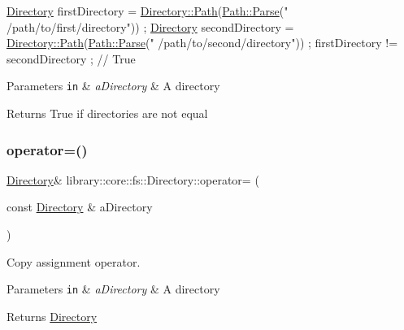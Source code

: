 \begin{DoxyCode}
\hyperlink{classlibrary_1_1core_1_1fs_1_1_directory_a3ec39f6cad19a81d520e9a1f2d8bb1f7}{Directory} firstDirectory = \hyperlink{classlibrary_1_1core_1_1fs_1_1_directory_a6d3ea04654841e62a4dbd99feb563caf}{Directory::Path}(\hyperlink{classlibrary_1_1core_1_1fs_1_1_path_a6ba644b6609507e724c217bf2020f5ae}{Path::Parse}(\textcolor{stringliteral}{"
      /path/to/first/directory"})) ;
\hyperlink{classlibrary_1_1core_1_1fs_1_1_directory_a3ec39f6cad19a81d520e9a1f2d8bb1f7}{Directory} secondDirectory = \hyperlink{classlibrary_1_1core_1_1fs_1_1_directory_a6d3ea04654841e62a4dbd99feb563caf}{Directory::Path}(\hyperlink{classlibrary_1_1core_1_1fs_1_1_path_a6ba644b6609507e724c217bf2020f5ae}{Path::Parse}(\textcolor{stringliteral}{"
      /path/to/second/directory"})) ;
firstDirectory != secondDirectory ; \textcolor{comment}{// True}
\end{DoxyCode}



\begin{DoxyParams}[1]{Parameters}
\mbox{\tt in}  & {\em a\+Directory} & A directory \\
\hline
\end{DoxyParams}
\begin{DoxyReturn}{Returns}
True if directories are not equal 
\end{DoxyReturn}
\mbox{\label{classlibrary_1_1core_1_1fs_1_1_directory_ae49af93d5b45fd410634ab14d82a690a}} 
\subsubsection{\texorpdfstring{operator=()}{operator=()}}
{\footnotesize\ttfamily \hyperlink{classlibrary_1_1core_1_1fs_1_1_directory}{Directory}\& library\+::core\+::fs\+::\+Directory\+::operator= (\begin{DoxyParamCaption}\item[{const \hyperlink{classlibrary_1_1core_1_1fs_1_1_directory}{Directory} \&}]{a\+Directory }\end{DoxyParamCaption})}



Copy assignment operator. 


\begin{DoxyParams}[1]{Parameters}
\mbox{\tt in}  & {\em a\+Directory} & A directory \\
\hline
\end{DoxyParams}
\begin{DoxyReturn}{Returns}
\hyperlink{classlibrary_1_1core_1_1fs_1_1_directory}{Directory} 
\end{DoxyReturn}
\mbox{\label{classlibrary_1_1core_1_1fs_1_1_directory_a7d1a76c04ba3750606c3f22519d0ef66}} 
